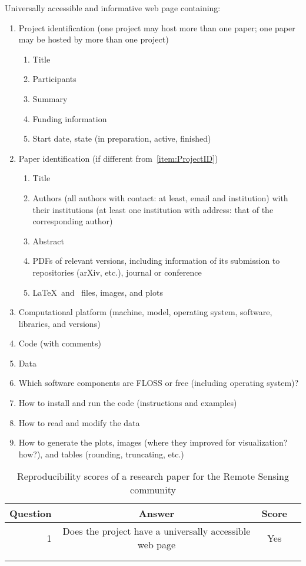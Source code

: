 \documentclass[journal]{IEEEtran}
\begin{document}
	Universally accessible and informative web page containing:
	\begin{enumerate}
		\item\label{item:ProjectID} Project identification (one project may host more than one paper; one paper may be hosted by more than one project)
		\begin{enumerate}
			\item Title
			\item Participants
			\item Summary
			\item Funding information
			\item Start date, state (in preparation, active, finished)
		\end{enumerate}
		\item Paper identification (if different from~\ref{item:ProjectID})
		\begin{enumerate}
			\item Title
			\item Authors (all authors with contact: at least, email and institution) with their institutions (at least one institution with address: that of the corresponding author)
			\item Abstract
			\item PDFs of relevant versions, including information of its submission to repositories (arXiv, etc.), journal or conference
			\item\label{item:SourceDocumentFiles} \LaTeX\ and \BibTeX\ files, images, and plots
		\end{enumerate}
		\item Computational platform (machine, model, operating system, software, libraries, and versions)
		\item Code (with comments)
		\item Data
		\item Which software components are FLOSS or free (including operating system)?
		\item How to install and run the code (instructions and examples)
		\item How to read and modify the data \item How to generate the plots, images (where they improved for visualization? how?), and tables (rounding, truncating, etc.)
		
	\end{enumerate}
	
	
	\begin{table*}[hbt]
		\centering
		\caption{Reproducibility scores of a research paper for the Remote Sensing community}
		\label{tab:my_label}
		\begin{tabular}{rccc}\toprule
			Question    & Answer & Score \\ \midrule
			1           & Does the project have a universally accessible web page & Yes & \\ 
			&  \\
			& \\ \bottomrule
		\end{tabular}
	\end{table*}
	
\end{document}
